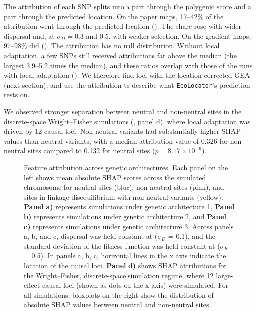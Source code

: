 \documentclass[]{article}
\newcommand{\ecolocator}{\texttt{EcoLocator}\xspace}
\providecommand{\revpoint}[2]{}%
\begin{document}
The attribution of each SNP splits into a part through the polygenic score
and a part through the predicted location.
On the paper maps, 17--42\% of the attribution
went through the predicted location ().
The share rose with wider dispersal and,
at $\sigma_D = 0.3$ and 0.5, with weaker selection.
On the gradient maps, 97--98\% did ().
The attribution has no null distribution.\revpoint{1}{16}
Without local adaptation,
a few SNPs still received attributions far above the median
(the largest 3.9--5.2 times the median),
and these ratios overlap with those of the runs with local adaptation
().
We therefore find loci with the location-corrected GEA (next section),
and use the attribution to describe
what \ecolocator's prediction rests on.

We observed stronger separation between neutral and non-neutral sites
in the discrete-space Wright--Fisher simulations
(, panel d),
where local adaptation was driven by 12 causal loci.
Non-neutral variants had substantially higher SHAP values
than neutral variants,
with a median attribution value of 0.326
for non-neutral sites compared to 0.132
for neutral sites
($p = 8.17 \times 10^{-9}$).


\begin{figure}[H]
    \caption{Feature attribution across genetic architectures. Each panel on the left shows
    mean absolute SHAP scores across the simulated chromosome for neutral sites 
    (blue), non-neutral sites (pink), and sites in linkage disequilibrium with
    non-neutral variants (yellow). \textbf{Panel a)} represents simulations under
    genetic architecture 1, \textbf{Panel b)} represents simulations under
    genetic architecture 2, and \textbf{Panel c)} represents simulations under
    genetic architecture 3. Across panels a, b, and c, dispersal was held constant
    at (\(\sigma_D\) = 0.1), and the standard deviation of the fitness function was held
    constant at (\(\sigma_K\) = 0.5). 
    In panels a, b, c, horizontal lines in the
    x axis indicate the location of the causal loci.
    \textbf{Panel d)} shows SHAP attributions
    for the Wright--Fisher, discrete-space simulation regime, where 12
    large-effect causal loci (shown as dots on the x-axis) were simulated.
    For all simulations, bloxplots on the right show the distribution of
    absolute SHAP values between neutral and non-neutral sites.}

    \label{fig:shap-attribution}
\end{figure}
\end{document}
